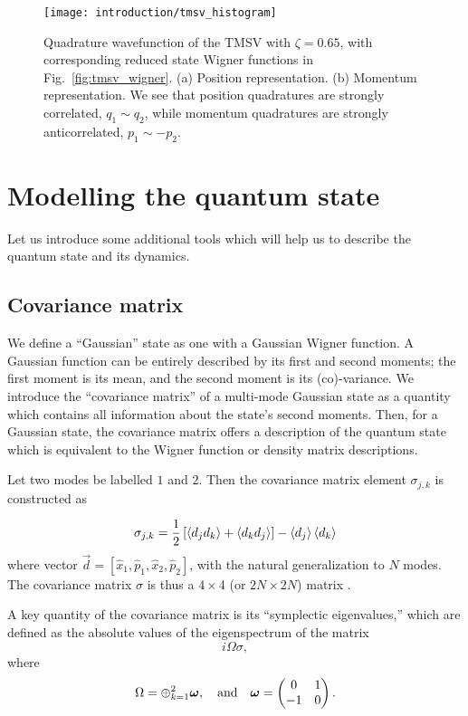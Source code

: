 \begin{figure}[htp]
\captionsetup{width=0.8\linewidth}
\centering
\texttt{[image: introduction/tmsv\_histogram]}
\caption{\label{fig:tmsv_histogram} Quadrature wavefunction of the TMSV with $\zeta = 0.65$, with corresponding reduced state Wigner functions in Fig.~\ref{fig:tmsv_wigner}. (a) Position representation. (b) Momentum representation. We see that position quadratures are strongly correlated, $q_1 \sim q_2$, while momentum quadratures are strongly anticorrelated, $p_1 \sim - p_2$.}
\end{figure}

\FloatBarrier
\section{Modelling the quantum state}
Let us introduce some additional tools which will help us to describe the quantum state and its dynamics.


\FloatBarrier
\subsection{Covariance matrix}
We define a ``Gaussian'' state as one with a Gaussian Wigner function. A Gaussian function can be entirely described by its first and second moments; the first moment is its mean, and the second moment is its (co)-variance. We introduce the ``covariance matrix'' of a multi-mode Gaussian state as a quantity which contains all information about the state's second moments. Then, for a Gaussian state, the covariance matrix offers a description of the quantum state which is equivalent to the Wigner function or density matrix descriptions. 


Let two modes be labelled $1$ and $2$. Then the covariance matrix element $\sigma_{j, k}$ is constructed as

\begin{equation}\label{eqn:intro_covariancematrix}
\sigma_{j, k} = \frac{1}{2} \left[ \ev{d_j d_k} + \ev{d_k d_j}\right] - \ev{d_j} \ev{d_k}
\end{equation}
where vector $\overrightarrow{d} = \left[\hat{x}_1, \hat{p}_1, \hat{x}_2, \hat{p}_2 \right]$, with the natural generalization to $N$ modes. The covariance matrix $\sigma$ is thus a $4 \times 4$ (or $2 N \times 2 N$) matrix . 

A key quantity of the covariance matrix is its ``symplectic eigenvalues,'' which are defined as the absolute values of the eigenspectrum of the matrix
\begin{equation}
i \Omega \sigma,
\end{equation}
where 
\begin{equation}
\Omega = \oplus_{k=1}^2 \bm{\omega}, \qq{and} \bm{\omega} = \pmqty{0 & 1 \\ -1 & 0}.
\end{equation}

